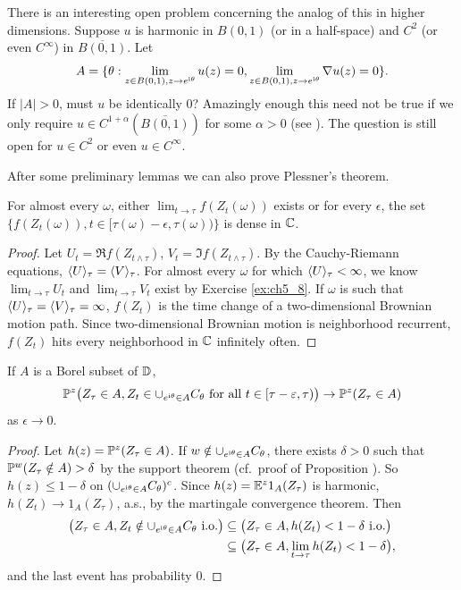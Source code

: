 There is an interesting open problem concerning the analog of this in higher dimensions. Suppose $u$ is harmonic in $B(0,1)$ (or in a half-space) and $C^2$ (or even $C^\infty$) in $\overline{B(0,1)}$. Let
\begin{equation}\label{eq:ch5_3.16}
    A = \{\theta : \lim_{z\in B(0,1),z\to e^{\im\theta}} u(z) = 0, \lim_{z\in B(0,1),z\to e^{\im\theta}} \nabla u(z) = 0\}.
\end{equation}
If $|A| > 0$, must $u$ be identically $0$? Amazingly enough this need not be true if we only require $u \in C^{1+\alpha}(\overline{B(0,1)})$ for some $\alpha > 0$ (see \cite{BourgainWolff1990}). The question is still open for $u \in C^2$ or even $u \in C^\infty$.


After some preliminary lemmas we can also prove Plessner's theorem.

\begin{lemma}\label{lem:ch5_3.5}
For almost every $\omega$, either $\lim_{t\to\tau} f(Z_t(\omega))$ exists or for every $\epsilon$, the set $\{f(Z_t(\omega)), t \in [\tau(\omega)-\epsilon,\tau(\omega))\}$ is dense in $\C$.
\end{lemma}

\begin{proof}
Let $U_t = \Re f(Z_{t\wedge\tau})$, $V_t = \Im f(Z_{t\wedge\tau})$. By the Cauchy-Riemann equations, $\lrang{U}_\tau = \lrang{V}_\tau$. For almost every $\omega$ for which $\lrang{U}_\tau < \infty$, we know $\lim_{t\to\tau} U_t$ and $\lim_{t\to\tau} V_t$ exist by Exercise \ref{ex:ch5_8}. If $\omega$ is such that $\lrang{U}_\tau = \lrang{V}_\tau = \infty$, $f(Z_t)$ is the time change of a two-dimensional Brownian motion path. Since two-dimensional Brownian motion is neighborhood recurrent, $f(Z_t)$ hits every neighborhood in $\C$ infinitely often.
\end{proof}

\begin{lemma}\label{lem:ch5_3.6}
If $A$ is a Borel subset of $\D$,
\[
    \P^z\big(Z_\tau \in A, Z_t \in \cup_{e^{\im\theta}\in A}C_\theta~\text{for all}~t \in [\tau-\epsilon,\tau)\big) \to \P^z(Z_\tau \in A)
\]
as $\epsilon \to 0$.
\end{lemma}

\begin{proof}
Let $h(z) = \P^z(Z_\tau \in A)$. If $w \notin \cup_{e^{\im\theta}\in A}C_\theta$, there exists $\delta > 0$ such that $\P^w(Z_\tau \notin A) > \delta$ by the support theorem (cf.\ proof of Proposition ). So $h(z) \leq 1-\delta$ on $(\cup_{e^{\im\theta}\in A}C_\theta)^c$. Since $h(z) = \E^z1_A(Z_\tau)$ is harmonic, $h(Z_t) \to 1_A(Z_\tau)$, a.s., by the martingale convergence theorem. Then
\begin{align*}
    \big(Z_\tau \in A, Z_t \notin \cup_{e^{\im\theta}\in A}C_\theta~\text{i.o.}\big) &\subseteq \big(Z_\tau \in A, h(Z_t) < 1-\delta~\text{i.o.}\big) \\
    &\subseteq \big(Z_\tau \in A, \lim_{t\to\tau} h(Z_t) < 1-\delta\big),
\end{align*}
and the last event has probability $0$.
\end{proof}

